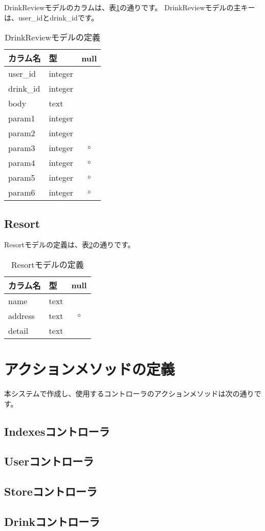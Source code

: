 \documentclass[a4j,titlepage]{jarticle}
\begin{document}
DrinkReviewモデルのカラムは、表\ref{drink_review}の通りです。
DrinkReviewモデルの主キーは、user\_idとdrink\_idです。

\begin{table}[!htbp]
\caption{DrinkReviewモデルの定義}
\label{drink_review}
\small
\begin{center}
\begin{tabular}{|l|l|c|}\hline
カラム名 & 型 & null \\\hline\hline
user\_id & integer & \\\hline
drink\_id & integer & \\\hline
body & text & \\\hline
param1 & integer & \\\hline
param2 & integer & \\\hline
param3 & integer & $\circ$ \\\hline
param4 & integer & $\circ$ \\\hline
param5 & integer & $\circ$ \\\hline
param6 & integer & $\circ$ \\\hline
\end{tabular}
\end{center}
\end{table}

\subsection{Resort}
Resortモデルの定義は、表\ref{resort}の通りです。

\begin{table}[!htbp]
\caption{Resortモデルの定義}
\label{resort}
\small
\begin{center}
\begin{tabular}{|l|l|c|}\hline
カラム名 & 型 & null \\\hline\hline
name & text & \\\hline
address & text & $\circ$ \\\hline
detail & text & \\\hline
\end{tabular}
\end{center}
\end{table}

\section{アクションメソッドの定義}
本システムで作成し、使用するコントローラのアクションメソッドは次の通りです。

\subsection{Indexesコントローラ}


\subsection{Userコントローラ}


\subsection{Storeコントローラ}


\subsection{Drinkコントローラ}
\end{document}
